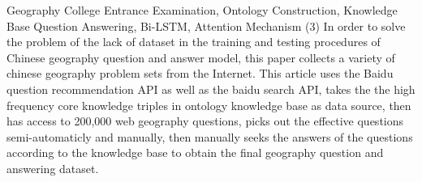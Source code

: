 \begin{englishabstract}{Geography College Entrance Examination, Ontology Construction, Knowledge Base Question Answering, Bi-LSTM, Attention Mechanism}
(3) In order to solve the problem of the lack of dataset in the training and testing procedures of Chinese geography question and answer model, this paper collects a variety of chinese geography problem sets from the Internet. This article uses the Baidu question recommendation API as well as the baidu search API, takes the the high frequency core knowledge triples in ontology knowledge base as data source, then has access to 200,000 web geography questions, picks out the effective questions semi-automaticly and manually, then manually seeks the answers of the questions according to the knowledge base to obtain the final geography question and answering dataset.

\end{englishabstract}